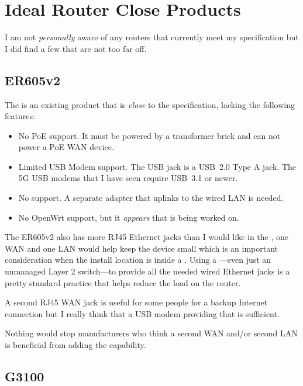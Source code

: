 \section{Ideal Router Close Products}

I am not \emph{personally} aware of any routers that currently meet my specification but I did find a few
that are not too far off.

\subsection{ER605v2}

The  is an
existing product that is \emph{close} to the  specification, lacking the following
features:

\begin{itemize}
  \item No PoE support. It must be powered by a transformer brick and can not power a PoE WAN device.
  \item Limited USB Modem support. The USB jack is a USB~2.0 Type A jack. The 5G USB modems that I have seen
        require USB~3.1 or newer.
  \item No \xdband{} support. A separate \xdband{} adapter that uplinks to the wired LAN
        is needed.
  \item No OpenWrt support, but it \emph{appears} that is being worked on.
\end{itemize}

The ER605v2 also has more RJ45 Ethernet jacks than I would like in the , one WAN and
one LAN would help keep the device small which is an important consideration when the install location is
inside a \tcab{}. Using a ---even just an unmanaged
Layer 2 switch---to provide all the needed wired Ethernet jacks is a pretty standard practice that helps
reduce the load on the router.

A second RJ45 WAN jack is useful for some people for a backup Internet connection but I really think that
a USB modem providing that is sufficient.

Nothing would stop manufacturers who think a second WAN and/or second LAN is beneficial from adding the
capability.

\subsection{G3100}


